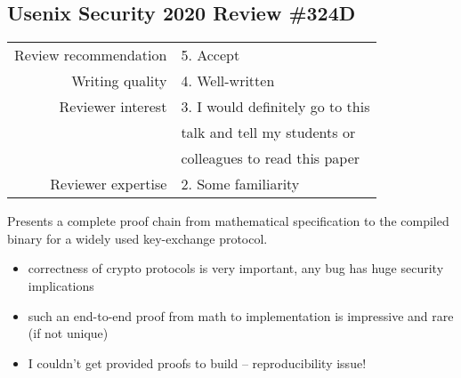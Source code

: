 \newpage
\subsection{Usenix Security 2020 Review \#324D}

\begin{tabular}{rl}
    \toprule
    Review recommendation & 5. Accept                        \\
    Writing quality       & 4. Well-written                  \\
    Reviewer interest     & 3. I would definitely go to this \\
                          & talk and tell my students or     \\
                          & colleagues to read this paper    \\
    Reviewer expertise    & 2. Some familiarity              \\
    \bottomrule
\end{tabular}

\begin{center}
\end{center}
Presents a complete proof chain from mathematical specification to the compiled binary for a widely used key-exchange protocol.

\begin{center}
\end{center}

\begin{itemize}
    \item correctness of crypto protocols is very important, any bug has huge security implications
    \item such an end-to-end proof from math to implementation is impressive and rare (if not unique)
\end{itemize}


\begin{center}
\end{center}

\begin{itemize}
    \item I couldn't get provided proofs to build – reproducibility issue!
\end{itemize}

\begin{center}
\end{center}

